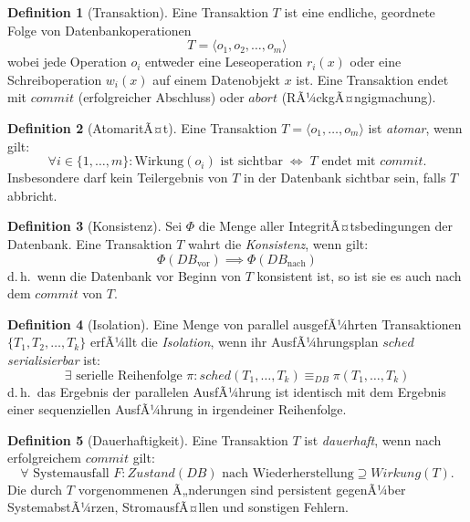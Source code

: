 ﻿\documentclass[a4paper,12pt]{article}
\theoremstyle{definition}
\newtheorem{definition}{Definition}
\begin{document}
\begin{definition}[Transaktion]
\label{def:transaktion}
Eine Transaktion $T$ ist eine endliche, geordnete Folge von Datenbankoperationen
\[
T = \langle o_1, o_2, \ldots, o_m \rangle
\]
wobei jede Operation $o_i$ entweder eine Leseoperation $r_i(x)$ oder eine Schreiboperation $w_i(x)$ auf einem Datenobjekt $x$ ist. Eine Transaktion endet mit $\mathit{commit}$ (erfolgreicher Abschluss) oder $\mathit{abort}$ (RÃ¼ckgÃ¤ngigmachung).
\end{definition}

\begin{definition}[AtomaritÃ¤t]
\label{def:atomaritaet}
Eine Transaktion $T = \langle o_1, \ldots, o_m \rangle$ ist \emph{atomar}, wenn gilt:
\[
\forall i \in \{1, \ldots, m\}: \text{Wirkung}(o_i) \text{ ist sichtbar} \;\Leftrightarrow\; T \text{ endet mit } \mathit{commit}.
\]
Insbesondere darf kein Teilergebnis von $T$ in der Datenbank sichtbar sein, falls $T$ abbricht.
\end{definition}

\begin{definition}[Konsistenz]
\label{def:konsistenz}
Sei $\Phi$ die Menge aller IntegritÃ¤tsbedingungen der Datenbank. Eine Transaktion $T$ wahrt die \emph{Konsistenz}, wenn gilt:
\[
\Phi(\mathit{DB}_{\text{vor}}) \implies \Phi(\mathit{DB}_{\text{nach}})
\]
d.\,h.\ wenn die Datenbank vor Beginn von $T$ konsistent ist, so ist sie es auch nach dem $\mathit{commit}$ von $T$.
\end{definition}

\begin{definition}[Isolation]
\label{def:isolation}
Eine Menge von parallel ausgefÃ¼hrten Transaktionen $\{T_1, T_2, \ldots, T_k\}$ erfÃ¼llt die \emph{Isolation}, wenn ihr AusfÃ¼hrungsplan $\mathit{sched}$ \emph{serialisierbar} ist:
\[
\exists \text{ serielle Reihenfolge } \pi: \mathit{sched}(T_1, \ldots, T_k) \equiv_{\mathit{DB}} \pi(T_1, \ldots, T_k)
\]
d.\,h.\ das Ergebnis der parallelen AusfÃ¼hrung ist identisch mit dem Ergebnis einer sequenziellen AusfÃ¼hrung in irgendeiner Reihenfolge.
\end{definition}

\begin{definition}[Dauerhaftigkeit]
\label{def:dauerhaftigkeit}
Eine Transaktion $T$ ist \emph{dauerhaft}, wenn nach erfolgreichem $\mathit{commit}$ gilt:
\[
\forall \text{ Systemausfall } F: \mathit{Zustand}(\mathit{DB}) \text{ nach Wiederherstellung} \supseteq \mathit{Wirkung}(T).
\]
Die durch $T$ vorgenommenen Ã„nderungen sind persistent gegenÃ¼ber SystemabstÃ¼rzen, StromausfÃ¤llen und sonstigen Fehlern.
\end{definition}
\end{document}
